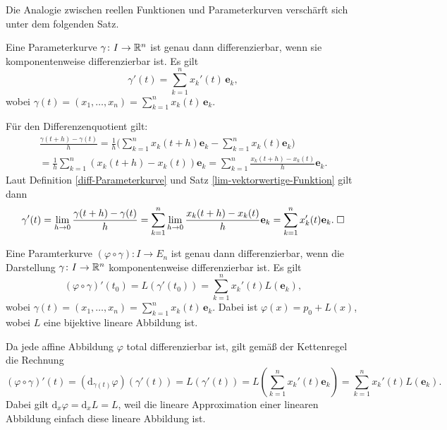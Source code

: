 \noindent
Die Analogie zwischen reellen Funktionen und Parameterkurven
verschärft sich unter dem folgenden Satz.

\begin{theorem}
Eine Parameterkurve $\gamma\colon I\to\mathbb R^n$ ist genau dann
differenzierbar, wenn sie komponentenweise differenzierbar
ist. Es gilt
\begin{equation}
\gamma'(t) = \sum_{k=1}^n x_k'(t)\,\mathbf e_k,
\end{equation}
wobei $\gamma(t)=(x_1,\ldots,x_n)=\sum_{k=1}^n x_k(t)\,\mathbf e_k$.
\end{theorem}

\noindent{}
Für den Differenzenquotient gilt:
\begin{gather}
\frac{\gamma(t+h)-\gamma(t)}{h}
= \frac{1}{h}\bigg(\sum_{k=1}^n x_k(t+h)\mathbf e_k-\sum_{k=1}^n x_k(t)\mathbf e_k\bigg)\\
= \frac{1}{h}\sum_{k=1}^n (x_k(t+h)-x_k(t))\mathbf e_k
= \sum_{k=1}^n \frac{x_k(t+h)-x_k(t)}{h}\mathbf e_k.
\end{gather}
Laut Definition \ref{diff-Parameterkurve} und
Satz \ref{lim-vektorwertige-Funktion} gilt dann
\begin{equation}
\gamma'(t) = \lim_{h\to 0}\frac{\gamma(t+h)-\gamma(t)}{h}
= \sum_{k=1}^n \lim_{h\to 0}\frac{x_k(t+h)-x_k(t)}{h}\mathbf e_k
= \sum_{k=1}^n x_k'(t)\mathbf e_k.\;\Box
\end{equation}

\begin{theorem}
Eine Paramterkurve $(\varphi\circ\gamma)\colon I\to E_n$ ist genau dann
differenzierbar, wenn die Darstellung $\gamma\colon I\to\mathbb R^n$
komponentenweise differenzierbar ist. Es gilt
\begin{equation}
(\varphi\circ\gamma)'(t_0) = L(\gamma'(t_0))
= \sum_{k=1}^n x_k'(t) L(\mathbf e_k),
\end{equation}
wobei $\gamma(t) = (x_1,\ldots,x_n) = \sum_{k=1}^n x_k(t)\,\mathbf e_k$.
Dabei ist $\varphi(x) = p_0+L(x)$, wobei $L$ eine bijektive lineare
Abbildung ist.
\end{theorem}

\noindent{}
Da jede affine Abbildung $\varphi$ total differenzierbar ist, gilt gemäß
der Kettenregel die Rechnung%
\begin{equation}
(\varphi\circ\gamma)'(t) = (\mathrm d_{\gamma(t)}\varphi)(\gamma'(t))
= L(\gamma'(t)) = L(\sum_{k=1}^n x_k'(t)\mathbf e_k)
= \sum_{k=1}^n x_k'(t)L(\mathbf e_k).
\end{equation}
Dabei gilt $\mathrm d_x \varphi = \mathrm d_x L = L$, weil die lineare
Approximation einer linearen Abbildung einfach diese lineare Abbildung
ist.\;\qedsymbol


